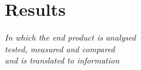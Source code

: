 \chapter{Results}\label{ch:res}

\begin{flushright}{\slshape
    In which the end product is analysed\\
    tested, measured and compared\\
    and is translated to information
}
\end{flushright}
